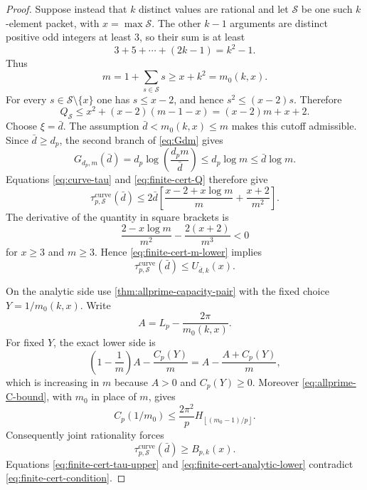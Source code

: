 \documentclass[11pt]{article}
\theoremstyle{definition}
\theoremstyle{remark}
\newcommand{\floor}[1]{\left\lfloor #1\right\rfloor}
\begin{document}
\begin{proof}
Suppose instead that $k$ distinct values are rational and let $\mathcal S$ be
one such $k$-element packet, with $x=\max\mathcal S$.  The other $k-1$
arguments are distinct positive odd integers at least $3$, so their sum is at
least
\[
 3+5+\cdots+(2k-1)=k^2-1.
\]
Thus
\begin{equation}\label{eq:finite-cert-m-lower}
 m=1+\sum_{s\in\mathcal S}s\ge x+k^2=m_0(k,x).
\end{equation}
For every $s\in\mathcal S\setminus\{x\}$ one has $s\le x-2$, and hence
$s^2\le(x-2)s$.  Therefore
\begin{equation}\label{eq:finite-cert-Q}
 Q_{\mathcal S}
 \le x^2+(x-2)(m-1-x)
 =(x-2)m+x+2.
\end{equation}
Choose $\xi=\bar d$.  The assumption $\bar d<m_0(k,x)\le m$ makes
this cutoff admissible.  Since $\bar d\ge d_p$, the second branch of
\eqref{eq:Gdm} gives
\[
 G_{d_p,m}(\bar d)
 =d_p\log\!\left(\frac{d_pm}{\bar d}\right)
 \le d_p\log m\le\bar d\log m.
\]
Equations \eqref{eq:curve-tau} and \eqref{eq:finite-cert-Q} therefore give
\[
 \tau^{\mathrm{curve}}_{p,\mathcal S}(\bar d)
 \le2\bar d\left[
 \frac{x-2+x\log m}{m}+\frac{x+2}{m^2}\right].
\]
The derivative of the quantity in square brackets is
\[
 \frac{2-x\log m}{m^2}-\frac{2(x+2)}{m^3}<0
\]
for $x\ge3$ and $m\ge3$.  Hence \eqref{eq:finite-cert-m-lower} implies
\begin{equation}\label{eq:finite-cert-tau-upper}
 \tau^{\mathrm{curve}}_{p,\mathcal S}(\bar d)\le U_{\bar d,k}(x).
\end{equation}

On the analytic side use \cref{thm:allprime-capacity-pair} with the fixed
choice $Y=1/m_0(k,x)$.  Write
\[
 A=L_p-\frac{2\pi}{m_0(k,x)}.
\]
For fixed $Y$, the exact lower side is
\[
 \left(1-\frac1m\right)A-\frac{C_p(Y)}m
 =A-\frac{A+C_p(Y)}m,
\]
which is increasing in $m$ because $A>0$ and $C_p(Y)\ge0$.  Moreover
\eqref{eq:allprime-C-bound}, with $m_0$ in place of $m$, gives
\[
 C_p(1/m_0)
 \le\frac{2\pi^2}{p}
 H_{\floor{(m_0-1)/p}}.
\]
Consequently joint rationality forces
\begin{equation}\label{eq:finite-cert-analytic-lower}
 \tau^{\mathrm{curve}}_{p,\mathcal S}(\bar d)\ge B_{p,k}(x).
\end{equation}
Equations \eqref{eq:finite-cert-tau-upper} and
\eqref{eq:finite-cert-analytic-lower} contradict
\eqref{eq:finite-cert-condition}.
\end{proof}
\end{document}
